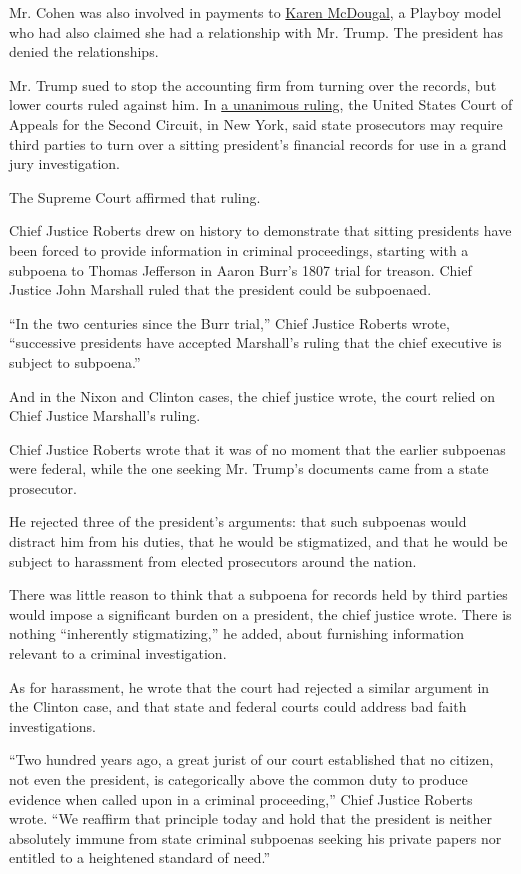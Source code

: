 Mr. Cohen was also involved in payments to
\href{https://www.nytimes3xbfgragh.onion/2019/12/05/us/fox-news-mcdougal.html}{Karen
McDougal}, a Playboy model who had also claimed she had a relationship
with Mr. Trump. The president has denied the relationships.

Mr. Trump sued to stop the accounting firm from turning over the
records, but lower courts ruled against him. In
\href{https://www.nytimes3xbfgragh.onion/2019/11/04/nyregion/trump-taxes-vance-appeal.html}{a
unanimous ruling}, the United States Court of Appeals for the Second
Circuit, in New York, said state prosecutors may require third parties
to turn over a sitting president's financial records for use in a grand
jury investigation.

The Supreme Court affirmed that ruling.

Chief Justice Roberts drew on history to demonstrate that sitting
presidents have been forced to provide information in criminal
proceedings, starting with a subpoena to Thomas Jefferson in Aaron
Burr's 1807 trial for treason. Chief Justice John Marshall ruled that
the president could be subpoenaed.

``In the two centuries since the Burr trial,'' Chief Justice Roberts
wrote, ``successive presidents have accepted Marshall's ruling that the
chief executive is subject to subpoena.''

And in the Nixon and Clinton cases, the chief justice wrote, the court
relied on Chief Justice Marshall's ruling.

Chief Justice Roberts wrote that it was of no moment that the earlier
subpoenas were federal, while the one seeking Mr. Trump's documents came
from a state prosecutor.

He rejected three of the president's arguments: that such subpoenas
would distract him from his duties, that he would be stigmatized, and
that he would be subject to harassment from elected prosecutors around
the nation.

There was little reason to think that a subpoena for records held by
third parties would impose a significant burden on a president, the
chief justice wrote. There is nothing ``inherently stigmatizing,'' he
added, about furnishing information relevant to a criminal
investigation.

As for harassment, he wrote that the court had rejected a similar
argument in the Clinton case, and that state and federal courts could
address bad faith investigations.

``Two hundred years ago, a great jurist of our court established that no
citizen, not even the president, is categorically above the common duty
to produce evidence when called upon in a criminal proceeding,'' Chief
Justice Roberts wrote. ``We reaffirm that principle today and hold that
the president is neither absolutely immune from state criminal subpoenas
seeking his private papers nor entitled to a heightened standard of
need.''

